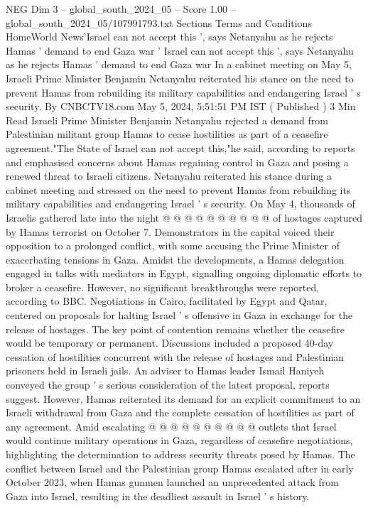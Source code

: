 \begin{textsample}{NEG Dim 3 – global\_south\_2024\_05 – Score 1.00 – global\_south\_2024\_05/107991793.txt}  \label{ex:f3_neg_354}
Sections Terms and Conditions HomeWorld News'Israel can not accept this ', says Netanyahu as he rejects Hamas ' demand to end Gaza war ' Israel can not accept this ', says Netanyahu as he rejects Hamas ' demand to end Gaza war In a cabinet meeting on May 5, Israeli Prime Minister Benjamin Netanyahu reiterated his stance on the need to prevent Hamas from rebuilding its military capabilities and endangering Israel ' s security.
By CNBCTV18.com May 5, 2024, 5:51:51 PM IST ( Published ) 3 Min Read Israeli Prime Minister Benjamin Netanyahu rejected a demand from Palestinian militant group Hamas to cease hostilities as part of a ceasefire agreement."The State of Israel can not accept this,"he said, according to reports and emphasised concerns about Hamas regaining control in Gaza and posing a renewed threat to Israeli citizens.
Netanyahu reiterated his stance during a cabinet meeting and stressed on the need to prevent Hamas from rebuilding its military capabilities and endangering Israel ' s security.
On May 4, thousands of Israelis gathered late into the night @ @ @ @ @ @ @ @ @ @ of hostages captured by Hamas terrorist on October 7.
Demonstrators in the capital voiced their opposition to a prolonged conflict, with some accusing the Prime Minister of exacerbating tensions in Gaza.
Amidst the developments, a Hamas delegation engaged in talks with mediators in Egypt, signalling ongoing diplomatic efforts to broker a ceasefire.
However, no significant breakthroughs were reported, according to BBC.
Negotiations in Cairo, facilitated by Egypt and Qatar, centered on proposals for halting Israel ' s offensive in Gaza in exchange for the release of hostages.
The key point of contention remains whether the ceasefire would be temporary or permanent.
Discussions included a proposed 40-day cessation of hostilities concurrent with the release of hostages and Palestinian prisoners held in Israeli jails.
An adviser to Hamas leader Ismail Haniyeh conveyed the group ' s serious consideration of the latest proposal, reports suggest.
However, Hamas reiterated its demand for an explicit commitment to an Israeli withdrawal from Gaza and the complete cessation of hostilities as part of any agreement.
Amid escalating @ @ @ @ @ @ @ @ @ @ outlets that Israel would continue military operations in Gaza, regardless of ceasefire negotiations, highlighting the determination to address security threats posed by Hamas.
The conflict between Israel and the Palestinian group Hamas escalated after in early October 2023, when Hamas gunmen launched an unprecedented attack from Gaza into Israel, resulting in the deadliest assault in Israel ' s history.

\end{textsample}
